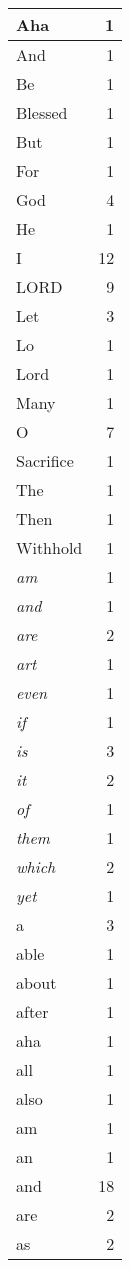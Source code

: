 \begin{center}
\begin{longtable}{l|r}
\hline \hline
\endlastfoot
Aha & 1 \\ \hline
And & 1 \\ \hline
Be & 1 \\ \hline
Blessed & 1 \\ \hline
But & 1 \\ \hline
For & 1 \\ \hline
God & 4 \\ \hline
He & 1 \\ \hline
I & 12 \\ \hline
LORD & 9 \\ \hline
Let & 3 \\ \hline
Lo & 1 \\ \hline
Lord & 1 \\ \hline
Many & 1 \\ \hline
O & 7 \\ \hline
Sacrifice & 1 \\ \hline
The & 1 \\ \hline
Then & 1 \\ \hline
Withhold & 1 \\ \hline
\emph{am} & 1 \\ \hline
\emph{and} & 1 \\ \hline
\emph{are} & 2 \\ \hline
\emph{art} & 1 \\ \hline
\emph{even} & 1 \\ \hline
\emph{if} & 1 \\ \hline
\emph{is} & 3 \\ \hline
\emph{it} & 2 \\ \hline
\emph{of} & 1 \\ \hline
\emph{them} & 1 \\ \hline
\emph{which} & 2 \\ \hline
\emph{yet} & 1 \\ \hline
a & 3 \\ \hline
able & 1 \\ \hline
about & 1 \\ \hline
after & 1 \\ \hline
aha & 1 \\ \hline
all & 1 \\ \hline
also & 1 \\ \hline
am & 1 \\ \hline
an & 1 \\ \hline
and & 18 \\ \hline
are & 2 \\ \hline
as & 2 \\ \hline

\end{longtable}
\end{center}
